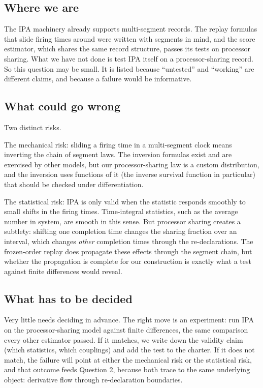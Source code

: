 \documentclass[11pt]{article}
\begin{document}
\subsection{Where we are}

The IPA machinery already supports multi-segment records. The replay
formulas that slide firing times around were written with segments in
mind, and the score estimator, which shares the same record structure,
passes its tests on processor sharing. What we have not done is test IPA
itself on a processor-sharing record. So this question may be small. It is
listed because ``untested'' and ``working'' are different claims, and
because a failure would be informative.

\subsection{What could go wrong}

Two distinct risks.

The mechanical risk: sliding a firing time in a multi-segment clock means
inverting the chain of segment laws. The inversion formulas exist and are
exercised by other models, but our processor-sharing law is a custom
distribution, and the inversion uses functions of it (the inverse survival
function in particular) that should be checked under differentiation.

The statistical risk: IPA is only valid when the statistic responds
smoothly to small shifts in the firing times. Time-integral statistics,
such as the average number in system, are smooth in this sense. But
processor sharing creates a subtlety: shifting one completion time changes
the sharing fraction over an interval, which changes \emph{other}
completion times through the re-declarations. The frozen-order replay does
propagate these effects through the segment chain, but whether the
propagation is complete for our construction is exactly what a test
against finite differences would reveal.

\subsection{What has to be decided}

Very little needs deciding in advance. The right move is an experiment:
run IPA on the processor-sharing model against finite differences, the
same comparison every other estimator passed. If it matches, we write down
the validity claim (which statistics, which couplings) and add the test to
the charter. If it does not match, the failure will point at either the
mechanical risk or the statistical risk, and that outcome feeds Question 2,
because both trace to the same underlying object: derivative flow through
re-declaration boundaries.
\end{document}

